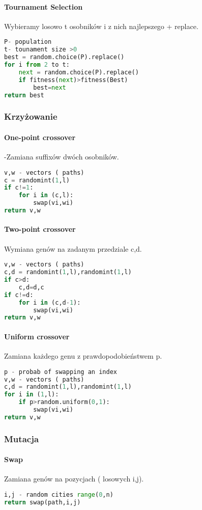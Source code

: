 \documentclass[11pt]{article}
\begin{document}
\paragraph{Tournament Selection}Wybieramy losowo t osobników i z nich najlepszego + replace.
\begin{lstlisting}[language=Python]
P- population
t- tounament size >0
best = random.choice(P).replace()
for i from 2 to t:
	next = random.choice(P).replace()
	if fitness(next)>fitness(Best)
		best=next
return best
\end{lstlisting}

\subsubsection{Krzyżowanie}
\paragraph{One-point crossover}-Zamiana suffixów dwóch osobników.
\begin{lstlisting}[language=Python ]
v,w - vectors ( paths)
c = randomint(1,l)
if c!=1:
	for i in (c,l):
		swap(vi,wi)
return v,w
\end{lstlisting}
\paragraph{Two-point crossover}Wymiana genów na zadanym przedziale c,d.
\begin{lstlisting}[language=Python]
v,w - vectors ( paths)
c,d = randomint(1,l),randomint(1,l)
if c>d:
	c,d=d,c
if c!=d:
	for i in (c,d-1):
		swap(vi,wi)
return v,w
\end{lstlisting}
\paragraph{Uniform crossover}Zamiana każdego genu z prawdopodobieństwem p.
\begin{lstlisting}[language=Python]
p - probab of swapping an index
v,w - vectors ( paths)
c,d = randomint(1,l),randomint(1,l)
for i in (1,l):
	if p>random.uniform(0,1):
		swap(vi,wi)
return v,w
\end{lstlisting}
\subsubsection{Mutacja}
\paragraph{Swap} Zamiana genów na pozycjach ( losowych i,j).
\begin{lstlisting}[language=Python]
i,j - random cities range(0,n)
return swap(path,i,j)
\end{lstlisting}
\end{document}
